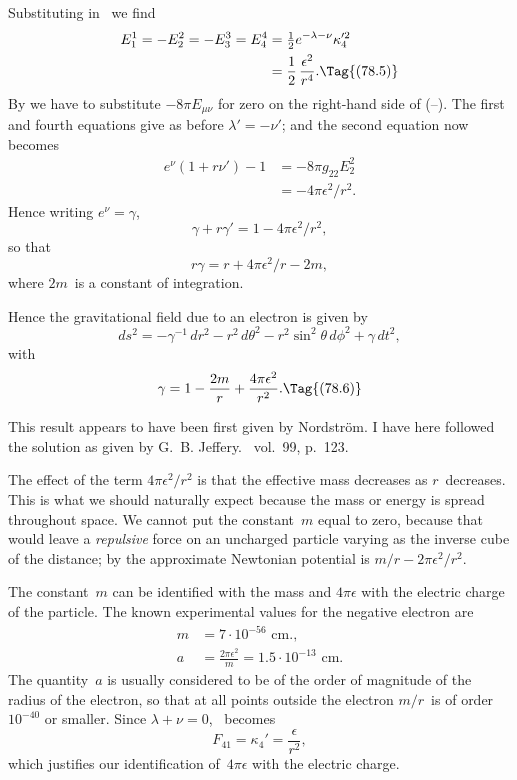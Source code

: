 \documentclass[12pt]{book}
\begin{document}
Substituting in~ we find
\begin{align*}
  E_{1}^{1}
  = -E_{2}^{2}
  = -E_{3}^{3}
  = E_{4}^{4}
  &= \tfrac{1}{2} e^{-\lambda-\nu} \kappa_{4}'^{2} \\
  &= \frac{1}{2}\, \frac{\epsilon^{2}}{r^{4}}.
  \Tag{(78.5)}
\end{align*}
By  we have to substitute $-8\pi E_{\mu\nu}$ for zero on the right-hand side of
(--). The first and fourth equations give as before $\lambda' = -\nu'$; and the
second equation now becomes
\begin{align*}
  e^{\nu} (1 + r\nu') - 1
  &= -8\pi g_{22} E_{2}^{2} \\
  &= -4\pi \epsilon^{2}/r^{2}.
\end{align*}
Hence writing $e^{\nu} = \gamma$,
\[
\gamma + r\gamma' = 1 - 4\pi \epsilon^{2}/r^{2},
\]
so that
\[
r\gamma = r + 4\pi \epsilon^{2}/r - 2m,
\]
where $2m$~is a constant of integration.

Hence the gravitational field due to an electron is given by
\[
ds^{2} = -\gamma^{-1}\, dr^{2} - r^{2}\, d\theta^2 - r^{2}\sin^{2}\theta\, d\phi^{2} + \gamma\, dt^{2},
\]
with
\[
\gamma = 1 - \frac{2m}{r} + \frac{4\pi\epsilon^{2}}{r^{2}}.
\Tag{(78.6)}
\]

This result appears to have been first given by Nordström. I have here
followed the solution as given by G.~B. Jeffery\footnotemark.\footnotetext
  {\ vol.~99, p.~123.}

The effect of the term $4\pi\epsilon^{2}/r^{2}$ is that the effective mass decreases as $r$~decreases.
This is what we should naturally expect because the mass or energy
is spread throughout space. We cannot put the constant~$m$ equal to zero,
because that would leave a \emph{repulsive} force on an uncharged particle varying
as the inverse cube of the distance; by  the approximate Newtonian
potential is $m/r - 2\pi\epsilon^{2}/r^{2}$.

The constant~$m$ can be identified with the mass and $4\pi\epsilon$ with the electric
charge of the particle. The known experimental values for the negative
electron are
\begin{align*}
m &= 7 \cdot 10^{-56} \text{ cm.}, \\
a &= \frac{2\pi\epsilon^{2}}{m} = 1.5 \cdot 10^{-13} \text{ cm.}
\end{align*}
The quantity~$a$ is usually considered to be of the order of magnitude of the
radius of the electron, so that at all points outside the electron $m/r$~is of order
$10^{-40}$ or smaller. Since $\lambda + \nu = 0$, ~becomes
\[
F_{41} = \kappa_{4}' = \frac{\epsilon}{r^{2}},
\]
which justifies our identification of~$4\pi\epsilon$ with the electric charge.
\end{document}
